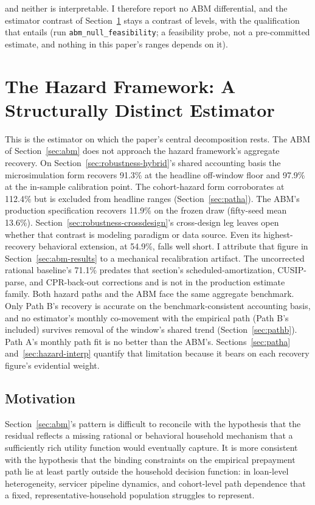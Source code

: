 \documentclass[12pt]{article}
\begin{document}
and neither is interpretable. I therefore report no ABM differential, and the estimator contrast of Section~\ref{sec:hazard} stays a contrast of levels, with the qualification that entails (run \texttt{abm\_null\_feasibility}; a feasibility probe, not a pre-committed estimate, and nothing in this paper's ranges depends on it).
\section{The Hazard Framework: A Structurally Distinct Estimator}\label{sec:hazard}

This is the estimator on which the paper's central decomposition rests. The ABM of Section~\ref{sec:abm} does not approach the hazard framework's aggregate recovery. On Section~\ref{sec:robustness-hybrid}'s shared accounting basis the microsimulation form recovers 91.3\% at the headline off-window floor and 97.9\% at the in-sample calibration point. The cohort-hazard form corroborates at 112.4\% but is excluded from headline ranges (Section~\ref{sec:patha}). The ABM's production specification recovers 11.9\% on the frozen draw (fifty-seed mean 13.6\%). Section~\ref{sec:robustness-crossdesign}'s cross-design leg leaves open whether that contrast is modeling paradigm or data source. Even its highest-recovery behavioral extension, at 54.9\%, falls well short. I attribute that figure in Section~\ref{sec:abm-results} to a mechanical recalibration artifact. The uncorrected rational baseline's 71.1\% predates that section's scheduled-amortization, CUSIP-parse, and CPR-back-out corrections and is not in the production estimate family. Both hazard paths and the ABM face the same aggregate benchmark. Only Path B's recovery is accurate on the benchmark-consistent accounting basis, and no estimator's monthly co-movement with the empirical path (Path B's included) survives removal of the window's shared trend (Section~\ref{sec:pathb}). Path A's monthly path fit is no better than the ABM's. Sections~\ref{sec:patha} and~\ref{sec:hazard-interp} quantify that limitation because it bears on each recovery figure's evidential weight.

\subsection{Motivation}\label{sec:hazard-motivation}

Section~\ref{sec:abm}'s pattern is difficult to reconcile with the hypothesis that the residual reflects a missing rational or behavioral household mechanism that a sufficiently rich utility function would eventually capture. It is more consistent with the hypothesis that the binding constraints on the empirical prepayment path lie at least partly outside the household decision function: in loan-level heterogeneity, servicer pipeline dynamics, and cohort-level path dependence that a fixed, representative-household population struggles to represent.
\end{document}
